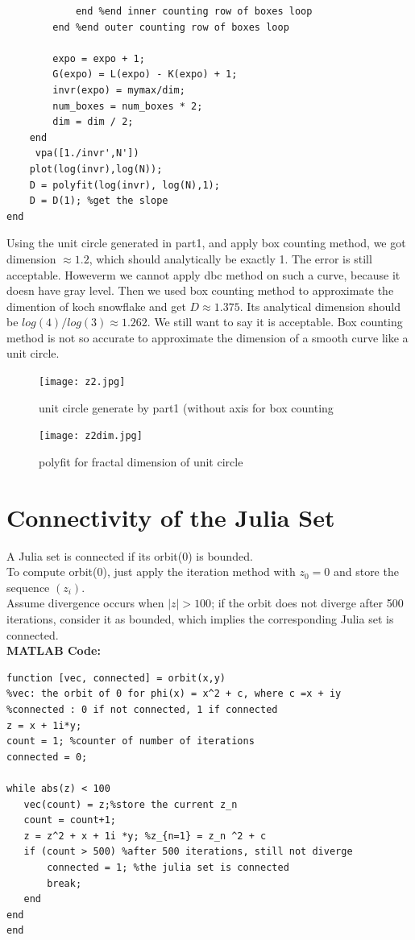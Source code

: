 \documentclass{article}
\begin{document}
\begin{lstlisting}
            end %end inner counting row of boxes loop
        end %end outer counting row of boxes loop

        expo = expo + 1;
        G(expo) = L(expo) - K(expo) + 1;     
        invr(expo) = mymax/dim;    
        num_boxes = num_boxes * 2;
        dim = dim / 2;
    end
     vpa([1./invr',N'])
    plot(log(invr),log(N));
    D = polyfit(log(invr), log(N),1);
    D = D(1); %get the slope
end
\end{lstlisting}

Using the unit circle generated in part1, and apply box counting method, we got dimension $\approx 1.2$, which should analytically be exactly 1. The error is still acceptable. Howeverm we cannot apply dbc method on such a curve, because it doesn have gray level. Then we used box counting method to approximate the dimention of koch snowflake and get $D \approx 1.375$. Its analytical dimension should be $log(4)/log(3) \approx 1.262$. We still want to say it is acceptable. Box counting method is not so accurate to approximate the dimension of a smooth curve like a unit circle.
\begin{figure}[H]
  \centering
  \begin{minipage}[b]{0.45\textwidth}
    \texttt{[image: z2.jpg]}
    \caption{unit circle generate by part1 (without axis for box counting}
  \end{minipage}
  \hfill
  \begin{minipage}[b]{0.5\textwidth}
    \texttt{[image: z2dim.jpg]}
    \caption{polyfit for fractal dimension of unit circle}
  \end{minipage}
   \end{figure}
\section{Connectivity of the Julia Set}
A Julia set is connected if its orbit(0) is bounded. \\
To compute orbit(0), just apply the iteration method with $z_0 = 0$ and store the sequence $(z_i)$.\\
Assume divergence occurs when $|z| > 100$; if the orbit does not diverge after 500 iterations, consider it as bounded, which implies the corresponding Julia set is connected.\\
\textbf{MATLAB Code:}
\begin{lstlisting}
function [vec, connected] = orbit(x,y)
%vec: the orbit of 0 for phi(x) = x^2 + c, where c =x + iy
%connected : 0 if not connected, 1 if connected
z = x + 1i*y;
count = 1; %counter of number of iterations
connected = 0;

while abs(z) < 100
   vec(count) = z;%store the current z_n 
   count = count+1;
   z = z^2 + x + 1i *y; %z_{n=1} = z_n ^2 + c
   if (count > 500) %after 500 iterations, still not diverge
       connected = 1; %the julia set is connected
       break;
   end
end
end
\end{lstlisting}
\end{document}
